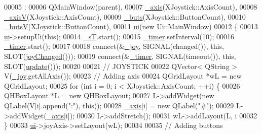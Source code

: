 \begin{DoxyCode}
00005                                       :
00006     QMainWindow(parent),
00007     \hyperlink{class_main_window_a30c99d7a544f74b0650758e5cc7ead5a}{\_axis}(XJoystick::AxisCount),
00008     \hyperlink{class_main_window_a20f66f574ed4c96d8dfc0013e1095f15}{\_axisV}(XJoystick::AxisCount),
00009     \hyperlink{class_main_window_a8eaf474e1b8672f32873ed009e28ce8a}{\_buts}(XJoystick::ButtonCount),
00010     \hyperlink{class_main_window_a519ae4630572cb63fbd04bce12fe8e77}{\_butsV}(XJoystick::ButtonCount),
00011     \hyperlink{class_main_window_a35466a70ed47252a0191168126a352a5}{ui}(\textcolor{keyword}{new} Ui::MainWindow)
00012 \{
00013     \hyperlink{class_main_window_a35466a70ed47252a0191168126a352a5}{ui}->setupUi(\textcolor{keyword}{this});
00014     \hyperlink{class_main_window_a97f8ecc7ecb930b796178cef7b975013}{\_sT}.start();
00015     \hyperlink{class_main_window_a254b03b878cfda75c1c411a2f8568d33}{\_timer}.setInterval(10);
00016     \hyperlink{class_main_window_a254b03b878cfda75c1c411a2f8568d33}{\_timer}.start();
00017     
00018     connect(&\hyperlink{class_main_window_a671f35800890e518713e1946671d8730}{\_joy}, SIGNAL(changed()), \textcolor{keyword}{this}, SLOT(\hyperlink{class_main_window_abb4c2d8a79c9f80010ea031366bf8226}{joyChanged}()));
00019     connect(&\hyperlink{class_main_window_a254b03b878cfda75c1c411a2f8568d33}{\_timer}, SIGNAL(timeout()), \textcolor{keyword}{this}, SLOT(\hyperlink{class_main_window_a128f71880d4b9683149023fc46fcc9f8}{update}()));
00020     
00021     \textcolor{comment}{// JOYSTICK}
00022     QVector< QString > V(\hyperlink{class_main_window_a671f35800890e518713e1946671d8730}{\_joy}.getAllAxis());
00023     \textcolor{comment}{// Adding axis}
00024     QGridLayout *wL = \textcolor{keyword}{new} QGridLayout;
00025     \textcolor{keywordflow}{for} (\textcolor{keywordtype}{int} i = 0; i < XJoystick::AxisCount; ++i) \{
00026         QHBoxLayout *L = \textcolor{keyword}{new} QHBoxLayout;
00027         L->addWidget(\textcolor{keyword}{new} QLabel(V[i].append(\textcolor{stringliteral}{":"}), \textcolor{keyword}{this}));
00028         \hyperlink{class_main_window_a30c99d7a544f74b0650758e5cc7ead5a}{\_axis}[i] = \textcolor{keyword}{new} QLabel(\textcolor{stringliteral}{"#"});
00029         L->addWidget(\hyperlink{class_main_window_a30c99d7a544f74b0650758e5cc7ead5a}{\_axis}[i]);
00030         L->addStretch();
00031         wL->addLayout(L, i%
00032     \}
00033     \hyperlink{class_main_window_a35466a70ed47252a0191168126a352a5}{ui}->joyAxis->setLayout(wL);
00034     
00035     \textcolor{comment}{// Adding buttons}

\end{DoxyCode}
